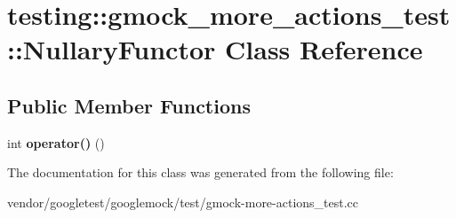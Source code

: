 \hypertarget{classtesting_1_1gmock__more__actions__test_1_1_nullary_functor}{}\section{testing\+:\+:gmock\+\_\+more\+\_\+actions\+\_\+test\+:\+:Nullary\+Functor Class Reference}
\label{classtesting_1_1gmock__more__actions__test_1_1_nullary_functor}
\subsection*{Public Member Functions}
\begin{DoxyCompactItemize}
\item 
\mbox{\label{classtesting_1_1gmock__more__actions__test_1_1_nullary_functor_a50f1e39b9ee381693e8bb871acf4e3a9}} 
int {\bfseries operator()} ()
\end{DoxyCompactItemize}


The documentation for this class was generated from the following file\+:\begin{DoxyCompactItemize}
\item 
vendor/googletest/googlemock/test/gmock-\/more-\/actions\+\_\+test.\+cc\end{DoxyCompactItemize}
